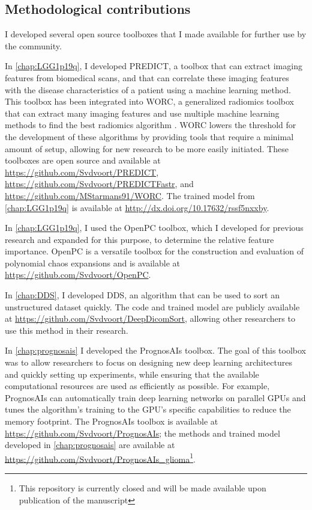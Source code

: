 \subsection{Methodological contributions}

I developed several open source toolboxes that I made available for further use by the community.

In \cref{chap:LGG1p19q}, I developed PREDICT, a toolbox that can extract imaging features from biomedical scans, and that can correlate these imaging features with the disease characteristics of a patient using a machine learning method.
This toolbox has been integrated into WORC, a generalized radiomics toolbox that can extract many imaging features and use multiple machine learning methods to find the best radiomics algorithm \autocite{mstarmans2020worc}.
WORC lowers the threshold for the development of these algorithms by providing tools that require a minimal amount of setup, allowing for new research to be more easily initiated.
These toolboxes are open source and available at \url{https://github.com/Svdvoort/PREDICT}, \url{https://github.com/Svdvoort/PREDICTFastr}, and \url{https://github.com/MStarmans91/WORC}.
The trained model from \cref{chap:LGG1p19q} is available at \url{http://dx.doi.org/10.17632/rssf5nxxby}.

In \cref{chap:LGG1p19q}, I used the OpenPC toolbox, which I developed for previous research and expanded for this purpose, to determine the relative feature importance.
OpenPC is a versatile toolbox for the construction and evaluation of polynomial chaos expansions and is available at \url{https://github.com/Svdvoort/OpenPC}.

In \cref{chap:DDS}, I developed \acrlong{DDS}, an algorithm that can be used to sort an unstructured dataset quickly.
The code and trained model are publicly available at \url{https://github.com/Svdvoort/DeepDicomSort}, allowing other researchers to use this method in their research.


In \cref{chap:prognosais} I developed the PrognosAIs toolbox.
The goal of this toolbox was to allow researchers to focus on designing new deep learning architectures and quickly setting up experiments, while ensuring that the available computational resources are used as efficiently as possible.
For example, PrognosAIs can automatically train deep learning networks on parallel GPUs and tunes the algorithm's training to the GPU's specific capabilities to reduce the memory footprint.
The PrognosAIs toolbox is available at \url{https://github.com/Svdvoort/PrognosAIs}; the methods and trained model developed in \cref{chap:prognosais} are available at \url{https://github.com/Svdvoort/PrognosAIs_glioma}\footnote{This repository is currently closed and will be made available upon publication of the manuscript}.

